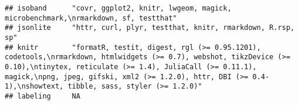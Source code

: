 \documentclass[]{book}
\begin{document}
\begin{verbatim}
## isoband      "covr, ggplot2, knitr, lwgeom, magick, microbenchmark,\nrmarkdown, sf, testthat"                                                                                                                                                                                                                                                                                                                                                                                                                                                                                                                                                                                                                          
## jsonlite     "httr, curl, plyr, testthat, knitr, rmarkdown, R.rsp, sp"                                                                                                                                                                                                                                                                                                                                                                                                                                                                                                                                                                                                                                                 
## knitr        "formatR, testit, digest, rgl (>= 0.95.1201), codetools,\nrmarkdown, htmlwidgets (>= 0.7), webshot, tikzDevice (>= 0.10),\ntinytex, reticulate (>= 1.4), JuliaCall (>= 0.11.1), magick,\npng, jpeg, gifski, xml2 (>= 1.2.0), httr, DBI (>= 0.4-1),\nshowtext, tibble, sass, styler (>= 1.2.0)"                                                                                                                                                                                                                                                                                                                                                                                                            
## labeling     NA                                                                                                                                                                                                                                                                                                                                                                                                                                                                                                                                                                                                                                                                                                        

\end{verbatim}
\end{document}
